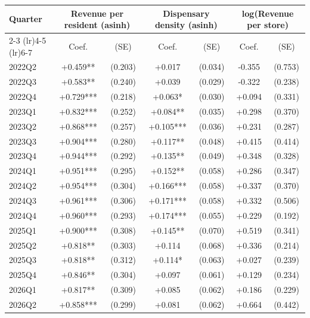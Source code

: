 \begin{tabular}{@{}lcccccc@{}}
\toprule
Quarter & \multicolumn{2}{c}{Revenue per resident (asinh)} & \multicolumn{2}{c}{Dispensary density (asinh)} & \multicolumn{2}{c}{log(Revenue per store)} \\
\cmidrule(lr){2-3} \cmidrule(lr){4-5} \cmidrule(lr){6-7}
& Coef. & (SE) & Coef. & (SE) & Coef. & (SE) \\
\midrule
2022Q2 & +0.459** & (0.203) & +0.017 & (0.034) & -0.355 & (0.753) \\
2022Q3 & +0.583** & (0.240) & +0.039 & (0.029) & -0.322 & (0.238) \\
2022Q4 & +0.729*** & (0.218) & +0.063* & (0.030) & +0.094 & (0.331) \\
2023Q1 & +0.832*** & (0.252) & +0.084** & (0.035) & +0.298 & (0.370) \\
2023Q2 & +0.868*** & (0.257) & +0.105*** & (0.036) & +0.231 & (0.287) \\
2023Q3 & +0.904*** & (0.280) & +0.117** & (0.048) & +0.415 & (0.414) \\
2023Q4 & +0.944*** & (0.292) & +0.135** & (0.049) & +0.348 & (0.328) \\
2024Q1 & +0.951*** & (0.295) & +0.152** & (0.058) & +0.286 & (0.347) \\
2024Q2 & +0.954*** & (0.304) & +0.166*** & (0.058) & +0.337 & (0.370) \\
2024Q3 & +0.961*** & (0.306) & +0.171*** & (0.058) & +0.332 & (0.506) \\
2024Q4 & +0.960*** & (0.293) & +0.174*** & (0.055) & +0.229 & (0.192) \\
2025Q1 & +0.900*** & (0.308) & +0.145** & (0.070) & +0.519 & (0.341) \\
2025Q2 & +0.818** & (0.303) & +0.114 & (0.068) & +0.336 & (0.214) \\
2025Q3 & +0.818** & (0.312) & +0.114* & (0.063) & +0.027 & (0.239) \\
2025Q4 & +0.846** & (0.304) & +0.097 & (0.061) & +0.129 & (0.234) \\
2026Q1 & +0.817** & (0.309) & +0.085 & (0.062) & +0.186 & (0.229) \\
2026Q2 & +0.858*** & (0.299) & +0.081 & (0.062) & +0.664 & (0.442) \\
\bottomrule
\end{tabular}
